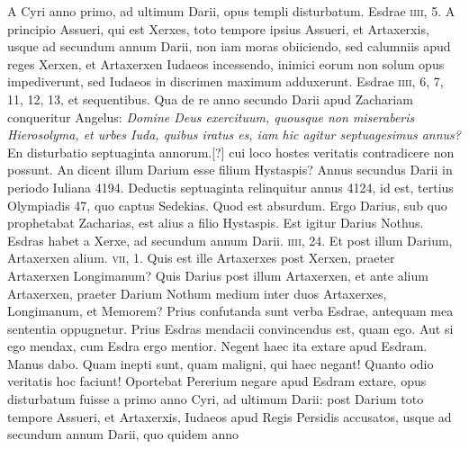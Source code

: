 A Cyri anno primo, ad ultimum Darii, opus
templi disturbatum.
Esdrae \textsc{iiii}, 5.
A principio Assueri, qui est
Xerxes, toto tempore ipsius Assueri, et Artaxerxis, usque ad secundum
annum Darii, non iam moras obiiciendo, sed calumniis apud
reges Xerxen, et Artaxerxen Iudaeos incessendo, inimici eorum
non solum opus impediverunt, sed Iudaeos in discrimen maximum
adduxerunt.
Esdrae \textsc{iiii}, 6, 7, 11, 12, 13, et sequentibus.
Qua de re
anno secundo Darii apud Zachariam conqueritur Angelus: \textit{Domine
Deus exercituum, quousque non miseraberis Hierosolyma, et
urbes Iuda, quibus iratus es, iam hic agitur septuagesimus annus?}
En disturbatio septuaginta annorum.[?] cui loco hostes
 veritatis contradicere
non possunt.
An dicent illum Darium esse filium Hystaspis?
Annus secundus Darii in periodo Iuliana 4194. Deductis septuaginta
relinquitur annus 4124, id est, tertius Olympiadis 47,
quo captus Sedekias.
Quod est absurdum.
Ergo Darius, sub quo
prophetabat Zacharias, est alius a filio Hystaspis.
Est igitur Darius
Nothus.
Esdras habet a Xerxe, ad secundum annum Darii.
\textsc{iiii}, 24.
Et post illum Darium, Artaxerxen alium.
\textsc{vii}, 1.
Quis
est ille Artaxerxes post Xerxen, praeter Artaxerxen Longimanum?
Quis Darius post illum Artaxerxen, et ante alium Artaxerxen, praeter
Darium Nothum medium inter duos Artaxerxes, Longimanum,
et Memorem?
Prius confutanda sunt verba Esdrae, antequam
mea sententia oppugnetur.
Prius Esdras mendacii convincendus
est, quam ego.
Aut si ego mendax, cum Esdra ergo mentior.
Negent haec ita extare apud Esdram.
Manus dabo.
Quam inepti
sunt, quam maligni, qui haec negant!
Quanto odio veritatis hoc faciunt!
Oportebat Pererium negare apud Esdram extare, opus disturbatum
fuisse a primo anno Cyri, ad ultimum Darii: post Darium
toto tempore Assueri, et Artaxerxis, Iudaeos apud Regis Persidis
accusatos, usque ad secundum annum Darii, quo quidem anno
